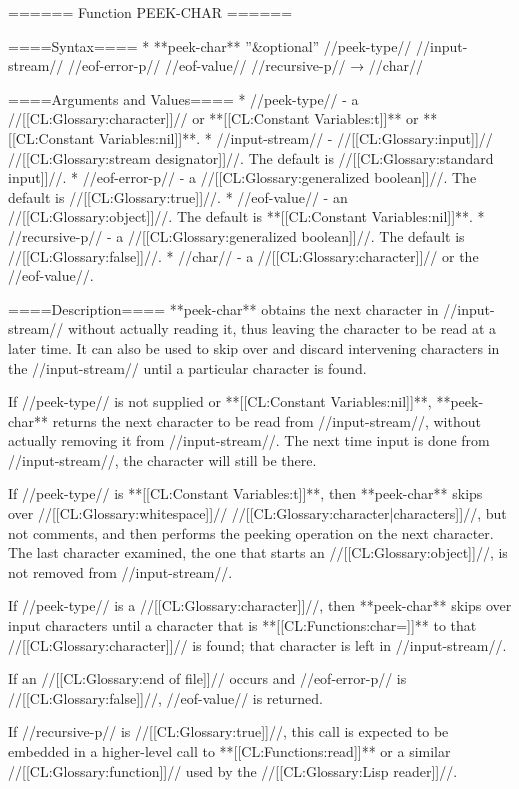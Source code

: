====== Function PEEK-CHAR ======

====Syntax====
  * **peek-char** ''&optional'' //peek-type// //input-stream// //eof-error-p// //eof-value// //recursive-p// → //char//

====Arguments and Values====
  * //peek-type// - a //[[CL:Glossary:character]]// or **[[CL:Constant Variables:t]]** or **[[CL:Constant Variables:nil]]**.
  * //input-stream// - //[[CL:Glossary:input]]// //[[CL:Glossary:stream designator]]//. The default is //[[CL:Glossary:standard input]]//.
  * //eof-error-p// - a //[[CL:Glossary:generalized boolean]]//. The default is //[[CL:Glossary:true]]//.
  * //eof-value// - an //[[CL:Glossary:object]]//. The default is **[[CL:Constant Variables:nil]]**.
  * //recursive-p// - a //[[CL:Glossary:generalized boolean]]//. The default is //[[CL:Glossary:false]]//.
  * //char// - a //[[CL:Glossary:character]]// or the //eof-value//.

====Description====
**peek-char** obtains the next character in //input-stream// without actually reading it, thus leaving the character to be read at a later time. It can also be used to skip over and discard intervening characters in the //input-stream// until a particular character is found.

If //peek-type// is not supplied or **[[CL:Constant Variables:nil]]**, **peek-char** returns the next character to be read from //input-stream//, without actually removing it from //input-stream//. The next time input is done from //input-stream//, the character will still be there.

If //peek-type// is **[[CL:Constant Variables:t]]**, then **peek-char** skips over //[[CL:Glossary:whitespace]]// //[[CL:Glossary:character|characters]]//, but not comments, and then performs the peeking operation on the next character. The last character examined, the one that starts an //[[CL:Glossary:object]]//, is not removed from //input-stream//.

If //peek-type// is a //[[CL:Glossary:character]]//, then **peek-char** skips over input characters until a character that is **[[CL:Functions:char=]]** to that //[[CL:Glossary:character]]// is found; that character is left in //input-stream//.

If an //[[CL:Glossary:end of file]]// occurs and //eof-error-p// is //[[CL:Glossary:false]]//, //eof-value// is returned.

If //recursive-p// is //[[CL:Glossary:true]]//, this call is expected to be embedded in a higher-level call to **[[CL:Functions:read]]** or a similar //[[CL:Glossary:function]]// used by the //[[CL:Glossary:Lisp reader]]//.

